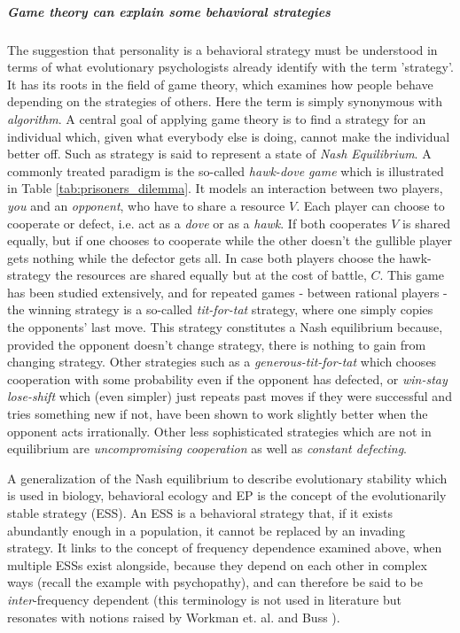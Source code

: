 \subparagraph*{Game theory can explain some behavioral strategies}
The suggestion that personality is a behavioral strategy must be understood in terms of what evolutionary psychologists already identify with the term 'strategy'. It has its roots in the field of game theory, which examines how people behave depending on the strategies of others. Here the term is simply synonymous with \textit{algorithm}. A central goal of applying game theory is to find a strategy for an individual which, given what everybody else is doing, cannot make the individual better off. Such as strategy is said to represent a state of \textit{Nash Equilibrium}. A commonly treated paradigm is the so-called \textit{hawk-dove game} which is illustrated in Table \ref{tab:prisoners_dilemma}.
It models an interaction between two players, \textit{you} and an \textit{opponent}, who have to share a resource $V$. Each player can choose to cooperate or defect, i.e. act as a \textit{dove} or as a \textit{hawk}. If both cooperates $V$ is shared equally, but if one chooses to cooperate while the other doesn't the gullible player gets nothing while the defector gets all. In case both players choose the hawk-strategy the resources are shared equally but at the cost of battle, $C$. This game has been studied extensively, and for repeated games - between rational players - the winning strategy is a so-called \textit{tit-for-tat} strategy, where one simply copies the opponents' last move. This strategy constitutes a Nash equilibrium because, provided the opponent doesn't change strategy, there is nothing to gain from changing strategy. Other strategies such as a \textit{generous-tit-for-tat} which chooses cooperation with some probability even if the opponent has defected, or \textit{win-stay lose-shift} which (even simpler) just repeats past moves if they were successful and tries something new if not, have been shown to work slightly better when the opponent acts irrationally. Other less sophisticated strategies which are not in equilibrium are \textit{uncompromising cooperation} as well as \textit{constant defecting}.

A generalization of the Nash equilibrium to describe evolutionary stability which is used in biology, behavioral ecology and EP is the concept of the evolutionarily stable strategy (ESS). An ESS is a behavioral strategy that, if it exists abundantly enough in a population, it cannot be replaced by an invading strategy. It links to the concept of frequency dependence examined above, when multiple ESSs exist alongside, because they depend on each other in complex ways (recall the example with psychopathy), and can therefore be said to be \textit{inter}-frequency dependent (this terminology is not used in literature but resonates with notions raised by Workman et. al. and Buss ).


